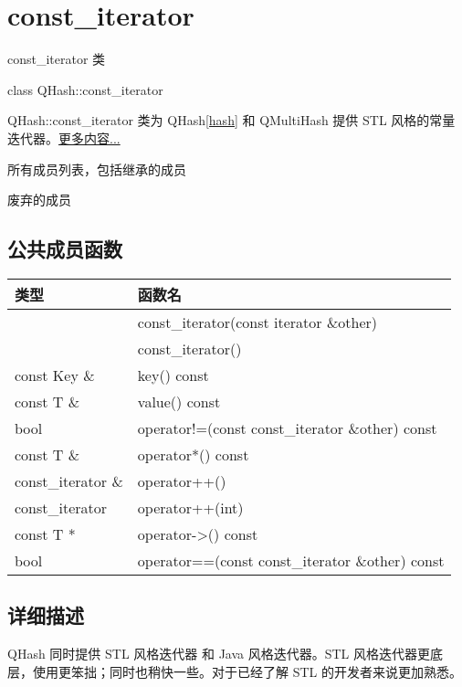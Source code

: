 \chapter{const\_iterator}

const\_iterator 类

class QHash::const\_iterator

QHash::const\_iterator 类为 QHash\ref{hash} 和 QMultiHash 提供 STL 风格的常量迭代器。\href{https://github.com/JackLovel/QtDocumentCN/blob/master/Src/H/QHash/QHash-const-iterator.md#%E8%AF%A6%E7%BB%86%E6%8F%8F%E8%BF%B0}{更多内容...}

\begin{compactitem}[\arr]
\item 所有成员列表，包括继承的成员
\item 废弃的成员
\end{compactitem}

\splitLine

\section{公共成员函数}

\begin{tabular}{|l|l|}
\hline
类型	&函数名\\
\hline
 	&const\_iterator(const iterator \&other)\\
\hline
	&const\_iterator()\\
\hline
const Key \& &	key() const\\
\hline
const T \& &	value() const\\
\hline
bool &	operator!=(const const\_iterator \&other) const\\
\hline
const T \& &	operator*() const\\
\hline
const\_iterator \& &	operator++()\\
\hline
const\_iterator 	&operator++(int)\\
\hline
const T * 	&operator->() const\\
\hline
bool 	&operator==(const const\_iterator \&other) const\\
\hline
\end{tabular}


\splitLine

\section{详细描述}

QHash 同时提供 STL 风格迭代器 和 Java 风格迭代器。STL 风格迭代器更底层，使用更笨拙；同时也稍快一些。对于已经了解 STL 的开发者来说更加熟悉。

